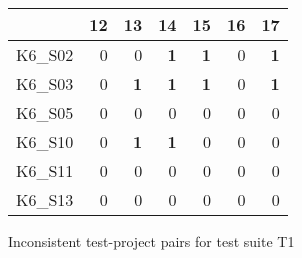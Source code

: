 \begin{figure}[htpb]
    \centering

    \begin{subfigure}{.4\textwidth}
        \centering

        \setlength{\tabcolsep}{0.2em}
        \tiny
        \begin{tabular}{l|rrrrrr}
            \toprule
                    & 12         & 13         & 14         & 15         & 16         & 17         \\
            \midrule
            K6\_S02 & 0          & 0          & \textbf{1} & \textbf{1} & 0          & \textbf{1} \\
            K6\_S03 & 0          & \textbf{1} & \textbf{1} & \textbf{1} & 0          & \textbf{1} \\
            K6\_S05 & 0          & 0          & 0          & 0          & 0          & 0          \\
            K6\_S10 & 0          & \textbf{1} & \textbf{1} & 0          & 0          & 0          \\
            K6\_S11 & 0          & 0          & 0          & 0          & 0          & 0          \\
            K6\_S13 & 0          & 0          & 0          & 0          & 0          & 0          \\
            \bottomrule
        \end{tabular}
        \caption{Inconsistent test-project pairs for test suite T1}
        \label{tab:inconsistencies_matrix_excerpt_normal}
        \setlength{\tabcolsep}{\defaulttabcolsep}
    \end{subfigure}
    \vspace{.08\textwidth}
    \begin{subfigure}{.4\textwidth}
        \centering


\end{subfigure}
\end{figure}
